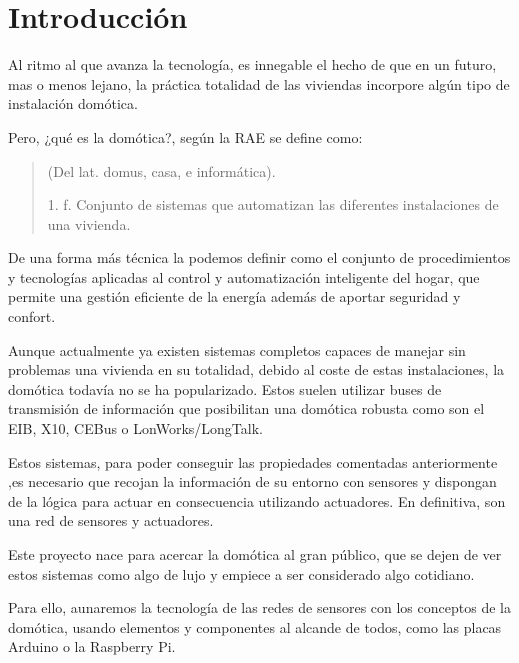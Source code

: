 \chapter{Introducción}

Al ritmo al que avanza la tecnología, es innegable el hecho de que en un futuro, mas o menos lejano, la práctica totalidad de las viviendas incorpore algún tipo de instalación domótica. 

Pero, ¿qué es la domótica?, según la RAE se define como:
\begin{quote}
    
    (Del lat. domus, casa, e informática).
    
    1. f. Conjunto de sistemas que automatizan las diferentes instalaciones de una vivienda.
    
\end{quote}
De una forma más técnica la podemos definir como el conjunto de procedimientos y tecnologías aplicadas al control y  automatización inteligente del hogar, que permite una gestión eficiente de la energía además de aportar seguridad y confort. 

Aunque actualmente ya existen sistemas completos capaces de manejar sin problemas una vivienda en su totalidad, debido al coste de estas instalaciones, la domótica todavía no se ha popularizado. Estos suelen utilizar buses de transmisión de información que posibilitan una domótica robusta como son el EIB, X10, CEBus o LonWorks/LongTalk. 

Estos sistemas, para poder conseguir las propiedades comentadas anteriormente ,es necesario que recojan  la información de su entorno con sensores y dispongan de la lógica para actuar en consecuencia utilizando actuadores. En definitiva, son una red de sensores y actuadores.

Este proyecto nace para acercar la domótica al gran público, que se dejen de ver estos sistemas como algo de lujo y empiece a ser considerado algo cotidiano. 

Para ello, aunaremos la tecnología de las redes de sensores con los conceptos de la domótica, usando elementos y componentes al alcande de todos, como las placas Arduino o la Raspberry Pi.

 











